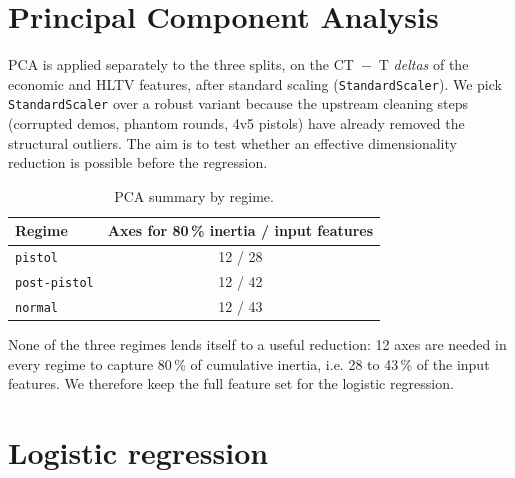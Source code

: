 \section{Principal Component Analysis}
\label{sec:acp}

PCA is applied separately to the three splits, on the CT~$-$~T
\emph{deltas} of the economic and HLTV features, after standard
scaling (\texttt{StandardScaler}). We pick \texttt{StandardScaler}
over a robust variant because the upstream cleaning steps (corrupted
demos, phantom rounds, 4v5 pistols) have already removed the
structural outliers. The aim is to test whether an effective
dimensionality reduction is possible before the regression.

\begin{table}[H]
\centering
\small
\begin{tabular}{lc}
\toprule
\textbf{Regime} & \textbf{Axes for 80\,\% inertia / input features} \\
\midrule
\texttt{pistol}      & 12 / 28 \\
\texttt{post-pistol} & 12 / 42 \\
\texttt{normal}      & 12 / 43 \\
\bottomrule
\end{tabular}
\caption{PCA summary by regime.}
\label{tab:pca_summary}
\end{table}

None of the three regimes lends itself to a useful reduction: 12 axes
are needed in every regime to capture 80\,\% of cumulative inertia,
i.e. 28 to 43\,\% of the input features. We therefore keep the full
feature set for the logistic regression.

\section{Logistic regression}
\label{sec:logreg}

